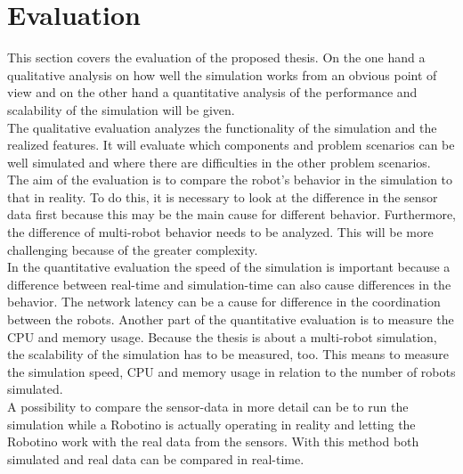 \documentclass[11pt,a4paper]{article}
\begin{document}
\section{Evaluation}
This section covers the evaluation of the proposed thesis. On the one hand a qualitative analysis on how well the simulation works from an obvious point of view and on the other hand a quantitative analysis of the performance and scalability of the simulation will be given.\\
The qualitative evaluation analyzes the functionality of the simulation and the realized features. It will evaluate which components and problem scenarios can be well simulated and where there are difficulties in the other problem scenarios. The aim of the evaluation is to compare the robot's behavior in the simulation to that in reality. To do this, it is necessary to look at the difference in the sensor data first because this may be the main cause for different behavior. Furthermore, the difference of multi-robot behavior needs to be analyzed. This will be more challenging because of the greater complexity.\\
In the quantitative evaluation the speed of the simulation is important because a difference between real-time and simulation-time can also cause differences in the behavior. The network latency can be a cause for difference in the coordination between the robots. Another part of the quantitative evaluation is to measure the CPU and memory usage. Because the thesis is about a multi-robot simulation, the scalability of the simulation has to be measured, too. This means to measure the simulation speed, CPU and memory usage in relation to the number of robots simulated.\\
A possibility to compare the sensor-data in more detail can be to run the simulation while a Robotino is actually operating in reality and letting the Robotino work with the real data from the sensors. With this method both simulated and real data can be compared in real-time.
\end{document}
